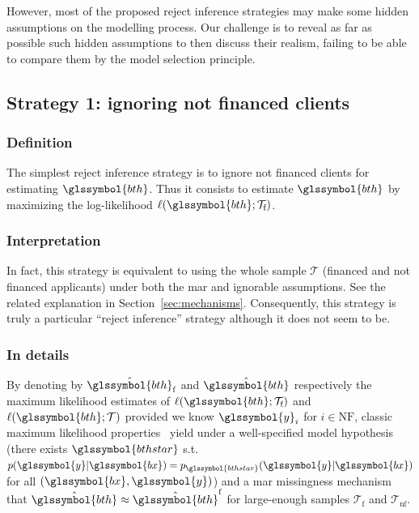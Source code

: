 However, most of the proposed reject inference strategies may make some hidden assumptions on the modelling process. Our challenge is to reveal as far as possible such hidden assumptions to then discuss their realism,  
failing to be able to compare them by the model selection principle.

\subsection{Strategy 1: ignoring not financed clients} \label{subsec:strat1}

\subsubsection{Definition}
The simplest reject inference strategy is to ignore not financed clients for estimating $\glssymbol{bth}$. Thus it consists to estimate $\glssymbol{bth}$ by maximizing the log-likelihood $\ell(\glssymbol{bth};\mathcal{T}_{\text{f}})$.

\subsubsection{Interpretation}
In fact, this strategy is equivalent to using the whole sample $\mathcal{T}$ (financed and not financed applicants) under both the \gls{mar} and ignorable assumptions. See the related explanation in Section~\ref{sec:mechanisms}. Consequently, this strategy is truly a particular ``reject inference'' strategy although it does not seem to be.

\subsubsection{In details}
By denoting by $\hat{\glssymbol{bth}}_\text{f}$ and $\hat{\glssymbol{bth}}$ respectively the maximum likelihood estimates of $\ell(\glssymbol{bth};\mathcal{T}_{\text{f}})$ and $\ell(\glssymbol{bth};\mathcal{T})$ provided we know $\glssymbol{y}_i$ for $i \in \text{NF}$, classic maximum likelihood properties~\cite{10.2307/1912526,zadrozny2004learning} yield under a well-specified model hypothesis (there exists $\glssymbol{bthstar}$ s.t.\ $p(\glssymbol{y} | \glssymbol{bx}) = p_{\glssymbol{bthstar}}(\glssymbol{y} | \glssymbol{bx})$ for all $(\glssymbol{bx},\glssymbol{y})$) and a \gls{mar} missingness mechanism that $\hat{\glssymbol{bth}} \approx \hat{\glssymbol{bth}}^\text{f}$ for large-enough samples $\mathcal{T}_{\text{f}}$ and $\mathcal{T}_{\text{nf}}$.



